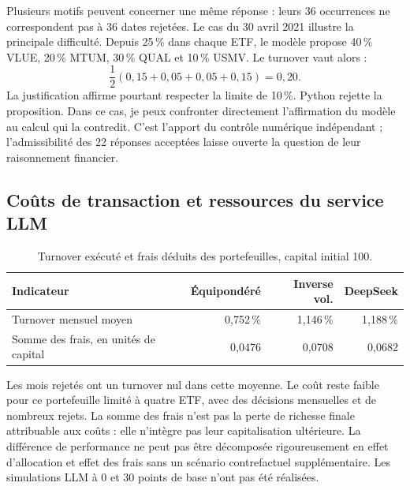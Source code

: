 Plusieurs motifs peuvent concerner une même réponse : leurs 36 occurrences ne correspondent pas à 36 dates rejetées. Le cas du 30 avril 2021 illustre la principale difficulté. Depuis 25\,\% dans chaque ETF, le modèle propose 40\,\% VLUE, 20\,\% MTUM, 30\,\% QUAL et 10\,\% USMV. Le turnover vaut alors :
\[
\frac{1}{2}\left(0{,}15+0{,}05+0{,}05+0{,}15\right)=0{,}20.
\]
La justification affirme pourtant respecter la limite de 10\,\%. Python rejette la proposition. Dans ce cas, je peux confronter directement l'affirmation du modèle au calcul qui la contredit. C'est l'apport du contrôle numérique indépendant ; l'admissibilité des 22 réponses acceptées laisse ouverte la question de leur raisonnement financier.

\subsection{Coûts de transaction et ressources du service LLM}\label{sec:couts-allocation}

\begin{table}[H]
\centering
\caption{Turnover exécuté et frais déduits des portefeuilles, capital initial 100.}
\label{tab:allocation-couts}
\small
\begin{tabular}{lrrr}
\toprule
\textbf{Indicateur} & \textbf{Équipondéré} & \textbf{Inverse vol.} & \textbf{DeepSeek} \\
\midrule
Turnover mensuel moyen & 0,752\,\% & 1,146\,\% & 1,188\,\% \\
Somme des frais, en unités de capital & 0,0476 & 0,0708 & 0,0682 \\
\bottomrule
\end{tabular}
\end{table}

Les mois rejetés ont un turnover nul dans cette moyenne. Le coût reste faible pour ce portefeuille limité à quatre ETF, avec des décisions mensuelles et de nombreux rejets. La somme des frais n'est pas la perte de richesse finale attribuable aux coûts : elle n'intègre pas leur capitalisation ultérieure. La différence de performance ne peut pas être décomposée rigoureusement en effet d'allocation et effet des frais sans un scénario contrefactuel supplémentaire. Les simulations LLM à 0 et 30 points de base n'ont pas été réalisées.

